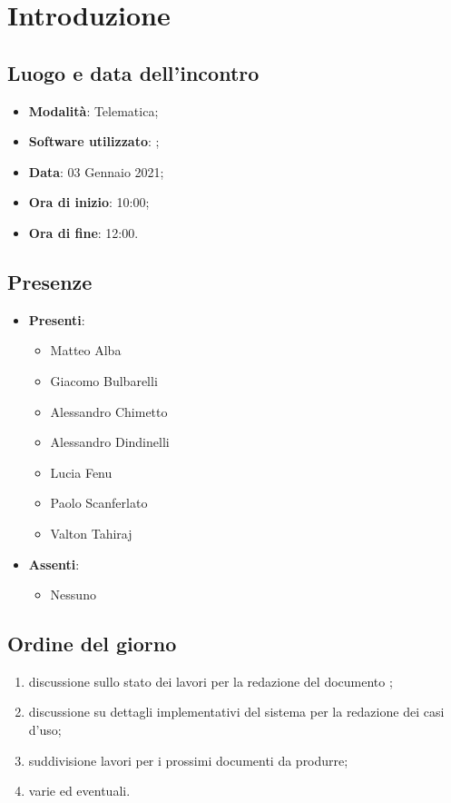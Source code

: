 \documentclass[]{article}
\begin{document}
	

	\newpage

	\section{Introduzione}
		\subsection{Luogo e data dell'incontro}
		\begin{itemize}
			\item \textbf{Modalità}: Telematica;
			\item \textbf{Software utilizzato}: ;
			\item \textbf{Data}: 03 Gennaio 2021;
			\item \textbf{Ora di inizio}: 10:00;
			\item \textbf{Ora di fine}: 12:00.
		\end{itemize}

		\subsection{Presenze}
		\begin{itemize}
			\item \textbf{Presenti}:
		\begin{itemize}
			\item Matteo Alba
			\item Giacomo Bulbarelli
			\item Alessandro Chimetto
			\item Alessandro Dindinelli
			\item Lucia Fenu
			\item Paolo Scanferlato
			\item Valton Tahiraj
		\end{itemize}
			\item \textbf{Assenti}:
			\begin{itemize}
				\item Nessuno
			\end{itemize}
		\end{itemize}

		\subsection{Ordine del giorno}
		\begin{enumerate}
            \item discussione sullo stato dei lavori per la redazione del documento ;
            \item discussione su dettagli implementativi del sistema per la redazione dei casi d'uso;
            \item suddivisione lavori per i prossimi documenti da produrre;
            \item varie ed eventuali.
		\end{enumerate}
\end{document}
